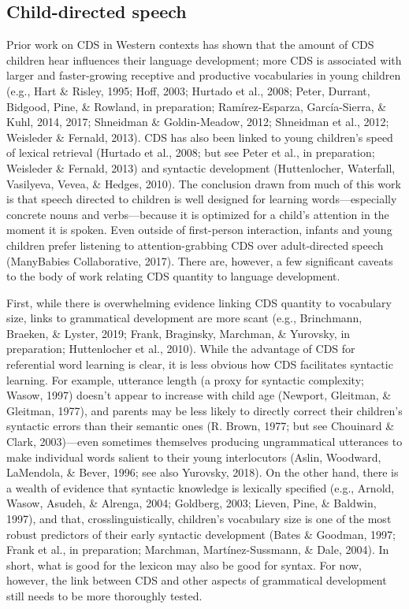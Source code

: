 \documentclass[floatsintext,man]{apa6}
\theoremstyle{definition}
\theoremstyle{definition}
\theoremstyle{definition}
\theoremstyle{remark}
\begin{document}
\subsection{Child-directed speech}\label{intro-cds}

Prior work on CDS in Western contexts has shown that the amount of CDS
children hear influences their language development; more CDS is
associated with larger and faster-growing receptive and productive
vocabularies in young children (e.g., Hart \& Risley, 1995; Hoff, 2003;
Hurtado et al., 2008; Peter, Durrant, Bidgood, Pine, \& Rowland, in
preparation; Ramírez-Esparza, García-Sierra, \& Kuhl, 2014, 2017;
Shneidman \& Goldin-Meadow, 2012; Shneidman et al., 2012; Weisleder \&
Fernald, 2013). CDS has also been linked to young children's speed of
lexical retrieval (Hurtado et al., 2008; but see Peter et al., in
preparation; Weisleder \& Fernald, 2013) and syntactic development
(Huttenlocher, Waterfall, Vasilyeva, Vevea, \& Hedges, 2010). The
conclusion drawn from much of this work is that speech directed to
children is well designed for learning words---especially concrete nouns
and verbs---because it is optimized for a child's attention in the
moment it is spoken. Even outside of first-person interaction, infants
and young children prefer listening to attention-grabbing CDS over
adult-directed speech (ManyBabies Collaborative, 2017). There are,
however, a few significant caveats to the body of work relating CDS
quantity to language development.

First, while there is overwhelming evidence linking CDS quantity to
vocabulary size, links to grammatical development are more scant (e.g.,
Brinchmann, Braeken, \& Lyster, 2019; Frank, Braginsky, Marchman, \&
Yurovsky, in preparation; Huttenlocher et al., 2010). While the
advantage of CDS for referential word learning is clear, it is less
obvious how CDS facilitates syntactic learning. For example, utterance
length (a proxy for syntactic complexity; Wasow, 1997) doesn't appear to
increase with child age (Newport, Gleitman, \& Gleitman, 1977), and
parents may be less likely to directly correct their children's
syntactic errors than their semantic ones (R. Brown, 1977; but see
Chouinard \& Clark, 2003)---even sometimes themselves producing
ungrammatical utterances to make individual words salient to their young
interlocutors (Aslin, Woodward, LaMendola, \& Bever, 1996; see also
Yurovsky, 2018). On the other hand, there is a wealth of evidence that
syntactic knowledge is lexically specified (e.g., Arnold, Wasow, Asudeh,
\& Alrenga, 2004; Goldberg, 2003; Lieven, Pine, \& Baldwin, 1997), and
that, crosslinguistically, children's vocabulary size is one of the most
robust predictors of their early syntactic development (Bates \&
Goodman, 1997; Frank et al., in preparation; Marchman,
Martínez-Sussmann, \& Dale, 2004). In short, what is good for the
lexicon may also be good for syntax. For now, however, the link between
CDS and other aspects of grammatical development still needs to be more
thoroughly tested.
\end{document}
